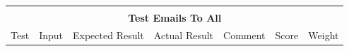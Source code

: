 \documentclass[11pt]{article}
\begin{document}
\begin{table}
\begin{tabular}{lllllrr}
                                                                                                                                       &                                                                                                                                                                           &                                                                                                            &                                                                                                            &                                                                                                                                                                                              & \multicolumn{1}{l}{}       & \multicolumn{1}{l}{}        \\
        \multicolumn{7}{c}{\textbf{Test Emails To All}}                                                                                                                                                                                                                                                                                                                                                                                                                                                                                                                                                                                                                                                                                                                                                \\ \hline
        \multicolumn{1}{|l|}{Test}                                                                                                     & \multicolumn{1}{l|}{Input}                                                                                                                                                & \multicolumn{1}{l|}{Expected Result}                                                                       & \multicolumn{1}{l|}{Actual Result}                                                                         & \multicolumn{1}{l|}{Comment}                                                                                                                                                                 & \multicolumn{1}{l|}{Score} & \multicolumn{1}{l|}{Weight} \\ \hline

\end{tabular}
\end{table}
\end{document}
